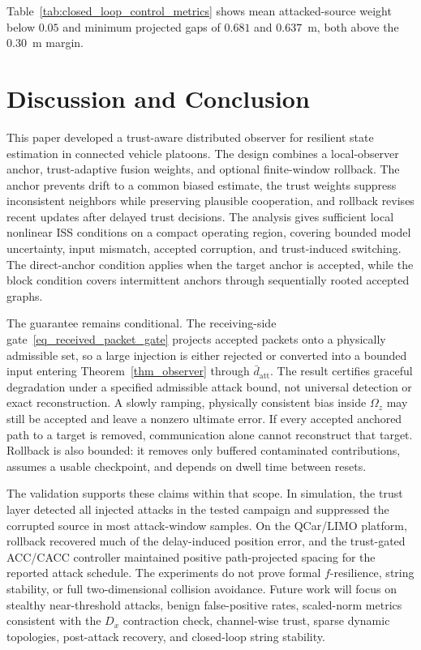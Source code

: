 \documentclass[letterpaper,journal]{IEEEtran}
\begin{document}
Table~\ref{tab:closed_loop_control_metrics} shows mean attacked-source weight below $0.05$ and minimum projected gaps of $0.681$ and $0.637$~m, both above the $0.30$~m margin.





\section{Discussion and Conclusion}\label{sec_discussion_conclusion}

This paper developed a trust-aware distributed observer for resilient state estimation in connected vehicle platoons. The design combines a local-observer anchor, trust-adaptive fusion weights, and optional finite-window rollback. The anchor prevents drift to a common biased estimate, the trust weights suppress inconsistent neighbors while preserving plausible cooperation, and rollback revises recent updates after delayed trust decisions. The analysis gives sufficient local nonlinear ISS conditions on a compact operating region, covering bounded model uncertainty, input mismatch, accepted corruption, and trust-induced switching. The direct-anchor condition applies when the target anchor is accepted, while the block condition covers intermittent anchors through sequentially rooted accepted graphs.

The guarantee remains conditional. The receiving-side gate~\eqref{eq_received_packet_gate} projects accepted packets onto a physically admissible set, so a large injection is either rejected or converted into a bounded input entering Theorem~\ref{thm_observer} through $\bar d_{\mathrm{att}}$. The result certifies graceful degradation under a specified admissible attack bound, not universal detection or exact reconstruction. A slowly ramping, physically consistent bias inside $\Omega_z$ may still be accepted and leave a nonzero ultimate error. If every accepted anchored path to a target is removed, communication alone cannot reconstruct that target. Rollback is also bounded: it removes only buffered contaminated contributions, assumes a usable checkpoint, and depends on dwell time between resets.

The validation supports these claims within that scope. In simulation, the trust layer detected all injected attacks in the tested campaign and suppressed the corrupted source in most attack-window samples. On the QCar/LIMO platform, rollback recovered much of the delay-induced position error, and the trust-gated ACC/CACC controller maintained positive path-projected spacing for the reported attack schedule. The experiments do not prove formal $f$-resilience, string stability, or full two-dimensional collision avoidance. Future work will focus on stealthy near-threshold attacks, benign false-positive rates, scaled-norm metrics consistent with the $D_x$ contraction check, channel-wise trust, sparse dynamic topologies, post-attack recovery, and closed-loop string stability.




\end{document}
